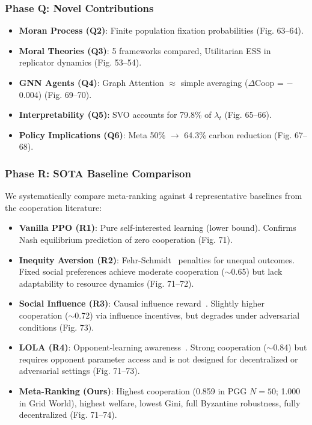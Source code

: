 \documentclass{article}
\begin{document}
\subsubsection{Phase Q: Novel Contributions}

\begin{itemize}
    \item \textbf{Moran Process (Q2)}: Finite population fixation probabilities (Fig. 63--64).
    \item \textbf{Moral Theories (Q3)}: 5 frameworks compared, Utilitarian ESS in replicator dynamics (Fig. 53--54).
    \item \textbf{GNN Agents (Q4)}: Graph Attention $\approx$ simple averaging ($\Delta$Coop = $-$0.004) (Fig. 69--70).
    \item \textbf{Interpretability (Q5)}: SVO accounts for 79.8\% of $\lambda_t$ (Fig. 65--66).
    \item \textbf{Policy Implications (Q6)}: Meta 50\% $\to$ 64.3\% carbon reduction (Fig. 67--68).
\end{itemize}

\subsubsection{Phase R: SOTA Baseline Comparison}

We systematically compare meta-ranking against 4 representative baselines from the cooperation literature:

\begin{itemize}
    \item \textbf{Vanilla PPO (R1)}: Pure self-interested learning (lower bound). Confirms Nash equilibrium prediction of zero cooperation (Fig. 71).
    \item \textbf{Inequity Aversion (R2)}: Fehr-Schmidt~\cite{fehr1999theory} penalties for unequal outcomes. Fixed social preferences achieve moderate cooperation ($\sim$0.65) but lack adaptability to resource dynamics (Fig. 71--72).
    \item \textbf{Social Influence (R3)}: Causal influence reward~\cite{jaques2019social}. Slightly higher cooperation ($\sim$0.72) via influence incentives, but degrades under adversarial conditions (Fig. 73).
    \item \textbf{LOLA (R4)}: Opponent-learning awareness~\cite{foerster2018lola}. Strong cooperation ($\sim$0.84) but requires opponent parameter access and is not designed for decentralized or adversarial settings (Fig. 71--73).
    \item \textbf{Meta-Ranking (Ours)}: Highest cooperation (0.859 in PGG $N{=}50$; 1.000 in Grid World), highest welfare, lowest Gini, full Byzantine robustness, fully decentralized (Fig. 71--74).
\end{itemize}
\end{document}
